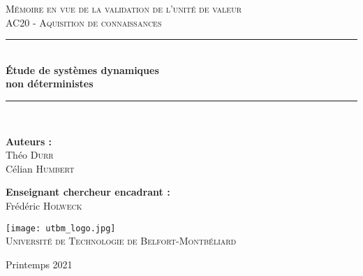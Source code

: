 \begin{titlepage}
    \newcommand{\HRule}{\rule{\linewidth}{0.1mm}} %
    \enlargethispage{2cm} %

    \begin{center}
        \textsc{\Large{}Mémoire en vue de la validation de l'unité de valeur} \\[0.5cm]
        \textsc{\large{}AC20 - Aquisition de connaissances} \\[1.5cm]

        \HRule \\[0.6cm]
        {\huge\bfseries{}\'Etude de systèmes dynamiques\\ non déterministes} \\[0.25cm]
        \HRule \\[1.5cm]

        \begin{flushleft}
            \Large\textbf{Auteurs :}\\[0.2cm]
                Théo \textsc{Durr} \\
                Célian \textsc{Humbert}

                \vspace{1cm} 

                \Large\textbf{Enseignant chercheur encadrant :}\\[0.2cm]
                Frédéric \textsc{Holweck}
        \end{flushleft}

        \vfill

        \texttt{[image: utbm\_logo.jpg]} \\
        \textsc{\LARGE{}Université de Technologie de Belfort-Montbéliard} \\[1.5cm]

        \vspace{1.5cm}

        Printemps 2021

    \end{center}
\end{titlepage}